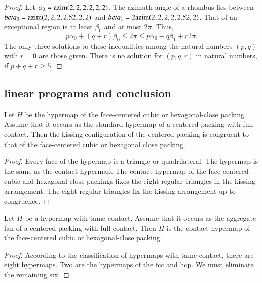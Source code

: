 \begin{proof} Let $\alpha_0 = {\operatorname{azim}}(2,2,2,2,2,2)$.  The azimuth angle of a rhombus lies between $beta_0 = {\operatorname{azim}}(2,2,2,2.52,2,2)$ and
$beta_1 = 2{\operatorname{azim}}(2,2,2,2,2.52,2)$.  That of an exceptional region is at least $\beta_0$ and at most $2\pi$.  Thus,
$$
p\alpha_0 + (q+r) \beta_0 \le 2\pi \le p\alpha_0 + q\beta_1 + r 2\pi.
$$
The only three solutions to these inequalities among the natural numbers $(p,q)$ with $r=0$ are those given. There is no solution for $(p,q,r)$ in natural numbers, if $p+q+r\ge 5$.
\end{proof}





\subsection{linear programs and conclusion}

\begin{lemma}\label{lemma:kiss-fcc} Let $H$ be the hypermap of the face-centered cubic or hexagonal-close packing.   Assume that it occurs as the standard hypermap of a centered packing with full contact.  Then the kissing configuration of the centered packing is congruent to that of the face-centered cubic or hexagonal close packing.
\end{lemma}

\begin{proof} Every face of the hypermap is a triangle or quadrilateral.  The  hypermap is the same as the contact hypermap.  The contact hypermap of the face-centered cubic and hexagonal-close packings fixes the eight regular triangles in the kissing arrangement.  The eight regular triangles fix the kissing arrangement up to congruence.
\end{proof}

\begin{lemma}\label{lemma:fcc-ft} Let $H$ be a hypermap with tame contact.  Assume that it occurs as the aggregate fan of a centered packing with full contact.  Then $H$ is the contact hypermap of the face-centered cubic or hexagonal-close packing.
\end{lemma}

\begin{proof} According to the classification of hypermaps with tame contact, there are eight hypermaps.  Two are the hypermaps of the fcc and hcp.  We must eliminate the remaining six.
\end{proof}

